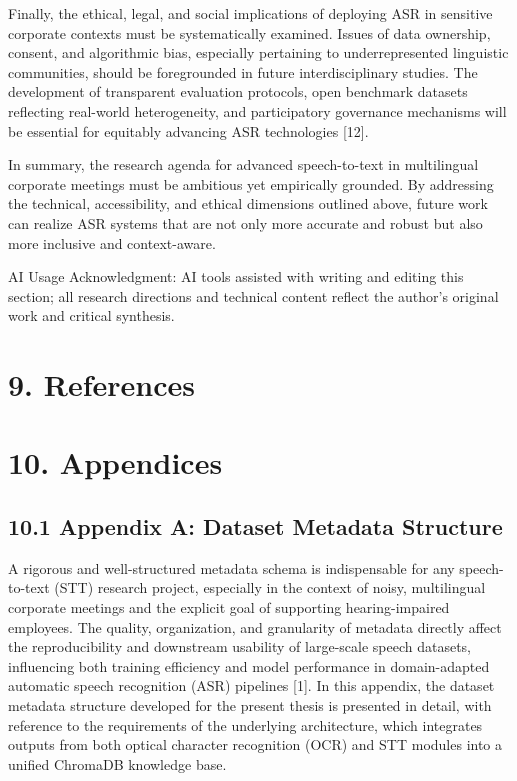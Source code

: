 \documentclass[12pt,a4paper]{article}
\begin{document}
Finally, the ethical, legal, and social implications of deploying ASR in sensitive corporate contexts must be systematically examined. Issues of data ownership, consent, and algorithmic bias, especially pertaining to underrepresented linguistic communities, should be foregrounded in future interdisciplinary studies. The development of transparent evaluation protocols, open benchmark datasets reflecting real-world heterogeneity, and participatory governance mechanisms will be essential for equitably advancing ASR technologies [12].


In summary, the research agenda for advanced speech-to-text in multilingual corporate meetings must be ambitious yet empirically grounded. By addressing the technical, accessibility, and ethical dimensions outlined above, future work can realize ASR systems that are not only more accurate and robust but also more inclusive and context-aware.


AI Usage Acknowledgment: AI tools assisted with writing and editing this section; all research directions and technical content reflect the author’s original work and critical synthesis.


\section{9. References}


\section{10. Appendices}


\subsection{10.1 Appendix A: Dataset Metadata Structure}


A rigorous and well-structured metadata schema is indispensable for any speech-to-text (STT) research project, especially in the context of noisy, multilingual corporate meetings and the explicit goal of supporting hearing-impaired employees. The quality, organization, and granularity of metadata directly affect the reproducibility and downstream usability of large-scale speech datasets, influencing both training efficiency and model performance in domain-adapted automatic speech recognition (ASR) pipelines [1]. In this appendix, the dataset metadata structure developed for the present thesis is presented in detail, with reference to the requirements of the underlying architecture, which integrates outputs from both optical character recognition (OCR) and STT modules into a unified ChromaDB knowledge base.
\end{document}
